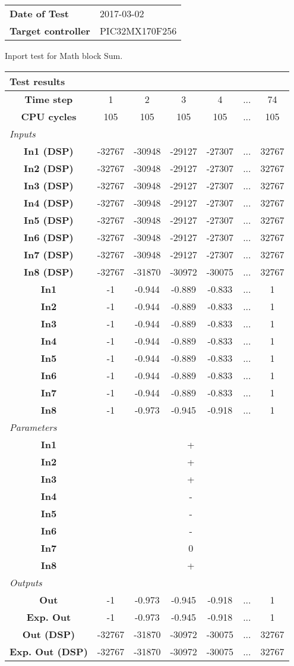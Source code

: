 \begin{tabular}{l l}
\textbf{Date of Test} & 2017-03-02 \tabularnewline
\textbf{Target controller} & PIC32MX170F256 \tabularnewline
\end{tabular}
\vspace{1ex}
Inport test for Math block Sum.

\vspace{1em}
\begin{tabularx}{\textwidth}{|c|c|c|c|c|>{\centering\arraybackslash}X|c|}
\hline
\multicolumn{7}{|l|}{\cellcolor[gray]{0.8}\textbf{Test results}} \tabularnewline \hline
\textbf{Time step} & 1 & 2 & 3 & 4 & ... & 74 \tabularnewline \hline
\textbf{CPU cycles} & 105 & 105 & 105 & 105 & ... & 105 \tabularnewline \hline
\multicolumn{7}{|l|}{\cellcolor[gray]{0.9}\textit{Inputs}} \tabularnewline \hline
\textbf{In1 (DSP)} & -32767 & -30948 & -29127 & -27307 & ... & 32767 \tabularnewline \hline
\textbf{In2 (DSP)} & -32767 & -30948 & -29127 & -27307 & ... & 32767 \tabularnewline \hline
\textbf{In3 (DSP)} & -32767 & -30948 & -29127 & -27307 & ... & 32767 \tabularnewline \hline
\textbf{In4 (DSP)} & -32767 & -30948 & -29127 & -27307 & ... & 32767 \tabularnewline \hline
\textbf{In5 (DSP)} & -32767 & -30948 & -29127 & -27307 & ... & 32767 \tabularnewline \hline
\textbf{In6 (DSP)} & -32767 & -30948 & -29127 & -27307 & ... & 32767 \tabularnewline \hline
\textbf{In7 (DSP)} & -32767 & -30948 & -29127 & -27307 & ... & 32767 \tabularnewline \hline
\textbf{In8 (DSP)} & -32767 & -31870 & -30972 & -30075 & ... & 32767 \tabularnewline \hline
\textbf{In1} & -1 & -0.944 & -0.889 & -0.833 & ... & 1 \tabularnewline \hline
\textbf{In2} & -1 & -0.944 & -0.889 & -0.833 & ... & 1 \tabularnewline \hline
\textbf{In3} & -1 & -0.944 & -0.889 & -0.833 & ... & 1 \tabularnewline \hline
\textbf{In4} & -1 & -0.944 & -0.889 & -0.833 & ... & 1 \tabularnewline \hline
\textbf{In5} & -1 & -0.944 & -0.889 & -0.833 & ... & 1 \tabularnewline \hline
\textbf{In6} & -1 & -0.944 & -0.889 & -0.833 & ... & 1 \tabularnewline \hline
\textbf{In7} & -1 & -0.944 & -0.889 & -0.833 & ... & 1 \tabularnewline \hline
\textbf{In8} & -1 & -0.973 & -0.945 & -0.918 & ... & 1 \tabularnewline \hline
\multicolumn{7}{|l|}{\cellcolor[gray]{0.9}\textit{Parameters}} \tabularnewline \hline
\textbf{In1} & \multicolumn{6}{c|}{+} \tabularnewline \hline
\textbf{In2} & \multicolumn{6}{c|}{+} \tabularnewline \hline
\textbf{In3} & \multicolumn{6}{c|}{+} \tabularnewline \hline
\textbf{In4} & \multicolumn{6}{c|}{-} \tabularnewline \hline
\textbf{In5} & \multicolumn{6}{c|}{-} \tabularnewline \hline
\textbf{In6} & \multicolumn{6}{c|}{-} \tabularnewline \hline
\textbf{In7} & \multicolumn{6}{c|}{0} \tabularnewline \hline
\textbf{In8} & \multicolumn{6}{c|}{+} \tabularnewline \hline
\multicolumn{7}{|l|}{\cellcolor[gray]{0.9}\textit{Outputs}} \tabularnewline \hline
\textbf{Out} & -1 & -0.973 & -0.945 & -0.918 & ... & 1 \tabularnewline \hline
\textbf{Exp. Out} & -1 & -0.973 & -0.945 & -0.918 & ... & 1 \tabularnewline \hline
\textbf{Out (DSP)} & -32767 & -31870 & -30972 & -30075 & ... & 32767 \tabularnewline \hline
\textbf{Exp. Out (DSP)} & -32767 & -31870 & -30972 & -30075 & ... & 32767 \tabularnewline \hline
\end{tabularx}

